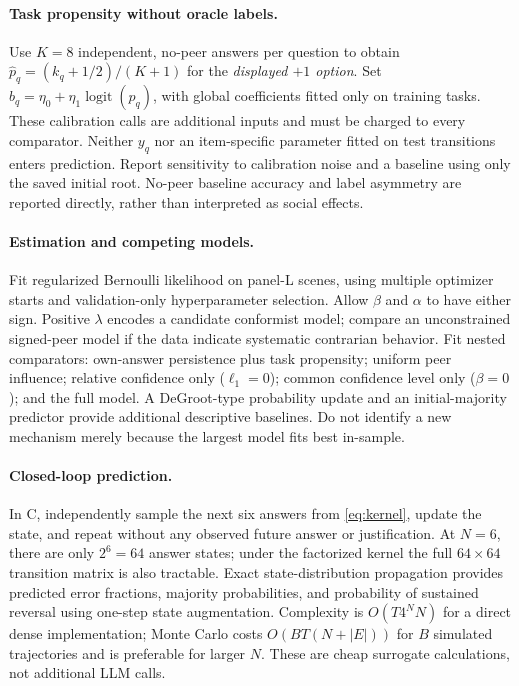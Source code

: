 \documentclass[11pt]{article}
\begin{document}
\paragraph{Task propensity without oracle labels.}
Use $K=8$ independent, no-peer answers per question to obtain $\widehat p_q=(k_q+1/2)/(K+1)$ for the \emph{displayed $+1$ option}. Set $b_q=\eta_0+\eta_1\operatorname{logit}(\widehat p_q)$, with global coefficients fitted only on training tasks. These calibration calls are additional inputs and must be charged to every comparator. Neither $y_q$ nor an item-specific parameter fitted on test transitions enters prediction. Report sensitivity to calibration noise and a baseline using only the saved initial root. No-peer baseline accuracy and label asymmetry are reported directly, rather than interpreted as social effects.

\paragraph{Estimation and competing models.}
Fit regularized Bernoulli likelihood on panel-L scenes, using multiple optimizer starts and validation-only hyperparameter selection. Allow $\beta$ and $\alpha$ to have either sign. Positive $\lambda$ encodes a candidate conformist model; compare an unconstrained signed-peer model if the data indicate systematic contrarian behavior. Fit nested comparators: own-answer persistence plus task propensity; uniform peer influence; relative confidence only ($\ell_1=0$); common confidence level only ($\beta=0$); and the full model. A DeGroot-type probability update and an initial-majority predictor provide additional descriptive baselines. Do not identify a new mechanism merely because the largest model fits best in-sample.

\paragraph{Closed-loop prediction.}
In C, independently sample the next six answers from \eqref{eq:kernel}, update the state, and repeat without any observed future answer or justification. At $N=6$, there are only $2^6=64$ answer states; under the factorized kernel the full $64\times64$ transition matrix is also tractable. Exact state-distribution propagation provides predicted error fractions, majority probabilities, and probability of sustained reversal using one-step state augmentation. Complexity is $O(T4^N N)$ for a direct dense implementation; Monte Carlo costs $O(BT(N+|E|))$ for $B$ simulated trajectories and is preferable for larger $N$. These are cheap surrogate calculations, not additional LLM calls.
\end{document}
